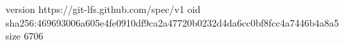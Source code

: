 version https://git-lfs.github.com/spec/v1
oid sha256:469693006a605e4fe0910df9ca2a47720b0232d4da6cc0bf8fcc4a7446b4a8a5
size 6706
